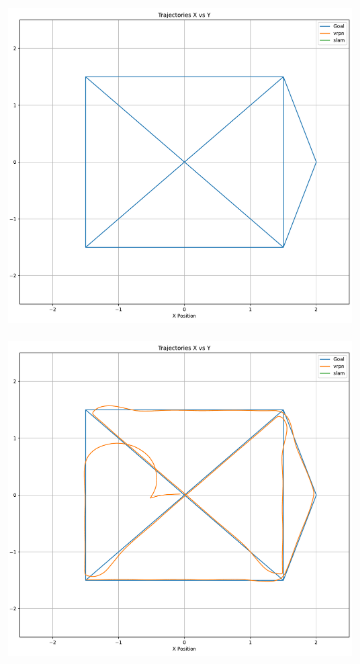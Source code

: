 \begin{figure}[htb]
    \centering
    \caption{Trajetória realizada pelo robô no primeiro experimento}
    \begin{subfigure}[b]{0.49\textwidth}
         \includegraphics[width=\textwidth]{img/Resultados/Exp1_VRPN_Control_LINEAR/Trajetoria_Goal.pdf}
    \end{subfigure}
    \begin{subfigure}[b]{0.49\textwidth}
        \includegraphics[width=\textwidth]{img/Resultados/Exp1_VRPN_Control_LINEAR/Trajetoria_VRPN_Goal.pdf}
    \end{subfigure}
    \source
    \label{fig:Trajetoria_VRPN_LINEAR}
\end{figure}

